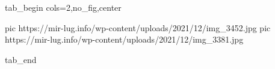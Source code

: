  
 
 
 
 


\ifcmt
  tab_begin cols=2,no_fig,center

     pic https://mir-lug.info/wp-content/uploads/2021/12/img_3452.jpg
		 pic https://mir-lug.info/wp-content/uploads/2021/12/img_3381.jpg

  tab_end
\fi
